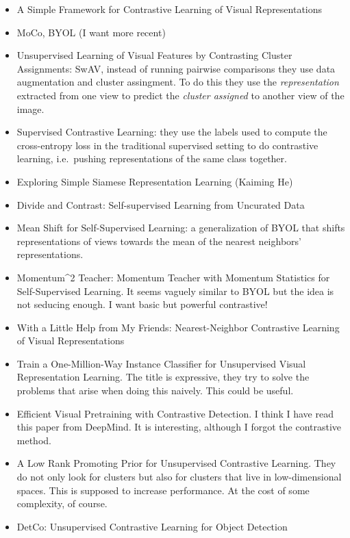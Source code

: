 \documentclass[
]{article}
\providecommand{\tightlist}{%
  \setlength{\itemsep}{0pt}\setlength{\parskip}{0pt}}
\begin{document}
\begin{itemize}
\tightlist
\item
  A Simple Framework for Contrastive Learning of Visual Representations
\item
  MoCo, BYOL (I want more recent)
\item
  Unsupervised Learning of Visual Features by Contrasting Cluster
  Assignments: SwAV, instead of running pairwise comparisons they use
  data augmentation and cluster assingment. To do this they use the
  \emph{representation} extracted from one view to predict the
  \emph{cluster assigned} to another view of the image.
\item
  Supervised Contrastive Learning: they use the labels used to compute
  the cross-entropy loss in the traditional supervised setting to do
  contrastive learning, i.e.~pushing representations of the same class
  together.
\item
  Exploring Simple Siamese Representation Learning (Kaiming He)
\item
  Divide and Contrast: Self-supervised Learning from Uncurated Data
\item
  Mean Shift for Self-Supervised Learning: a generalization of BYOL that
  shifts representations of views towards the mean of the nearest
  neighbors' representations.
\item
  Momentum\^{}2 Teacher: Momentum Teacher with Momentum Statistics for
  Self-Supervised Learning. It seems vaguely similar to BYOL but the
  idea is not seducing enough. I want basic but powerful contrastive!
\item
  With a Little Help from My Friends: Nearest-Neighbor Contrastive
  Learning of Visual Representations
\item
  Train a One-Million-Way Instance Classifier for Unsupervised Visual
  Representation Learning. The title is expressive, they try to solve
  the problems that arise when doing this naively. This could be useful.
\item
  Efficient Visual Pretraining with Contrastive Detection. I think I
  have read this paper from DeepMind. It is interesting, although I
  forgot the contrastive method.
\item
  A Low Rank Promoting Prior for Unsupervised Contrastive Learning. They
  do not only look for clusters but also for clusters that live in
  low-dimensional spaces. This is supposed to increase performance. At
  the cost of some complexity, of course.
\item
  DetCo: Unsupervised Contrastive Learning for Object Detection

\end{itemize}
\end{document}
